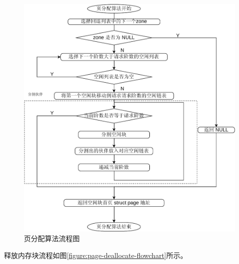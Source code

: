 \documentclass[AutoFakeBold]{LZUThesis}
\begin{document}
\begin{sloppypar}
\begin{figure}[H]
\centering
\includegraphics{images/page-alloc-flowchart.drawio.pdf}
\caption{页分配算法流程图}
\label{figure:page-alloc-flowchart}
\end{figure}

释放内存块流程如图\ref{figure:page-deallocate-flowchart}所示。


\end{sloppypar}
\end{document}
